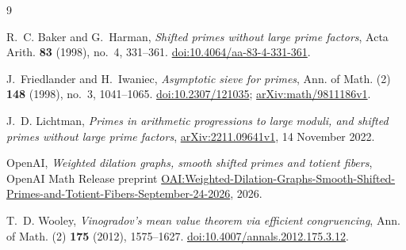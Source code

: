 \begingroup
\raggedright
\begin{thebibliography}{9}

R.~C. Baker and G.~Harman,
\emph{Shifted primes without large prime factors},
Acta Arith. \textbf{83} (1998), no.~4, 331--361.
\href{https://doi.org/10.4064/aa-83-4-331-361}{doi:10.4064/aa-83-4-331-361}.

J.~Friedlander and H.~Iwaniec,
\emph{Asymptotic sieve for primes},
Ann. of Math. (2) \textbf{148} (1998), no.~3, 1041--1065.
\href{https://doi.org/10.2307/121035}{doi:10.2307/121035};
\href{https://arxiv.org/abs/math/9811186v1}{arXiv:math/9811186v1}.

J.~D. Lichtman,
\emph{Primes in arithmetic progressions to large moduli, and shifted
primes without large prime factors},
\href{https://arxiv.org/abs/2211.09641v1}{arXiv:2211.09641v1},
14 November 2022.

OpenAI,
\emph{Weighted dilation graphs, smooth shifted primes and totient fibers},
OpenAI Math Release preprint
\href{https://github.com/openai/math/blob/main/preprints/Weighted-Dilation-Graphs-Smooth-Shifted-Primes-and-Totient-Fibers-September-24-2026/paper.pdf}{OAI:Weighted-Dilation-Graphs-Smooth-Shifted-Primes-and-Totient-Fibers-September-24-2026},
2026.

T.~D. Wooley,
\emph{Vinogradov's mean value theorem via efficient congruencing},
Ann. of Math. (2) \textbf{175} (2012), 1575--1627.
\href{https://doi.org/10.4007/annals.2012.175.3.12}{doi:10.4007/annals.2012.175.3.12}.

\end{thebibliography}
\endgroup
